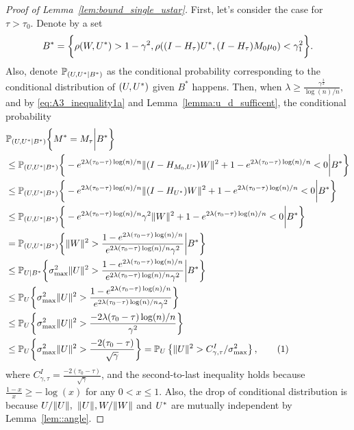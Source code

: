 \documentclass[10pt,a4paper]{amsart}
\def\P{\mathbb P}
\newcommand\numberthis{\addtocounter{equation}{1}\tag{\theequation}}
\begin{document}
\begin{proof}[Proof of Lemma~\ref{lem:bound_single_ustar}]
First, let's consider the case for $\tau > \tau_0.$
Denote by a set 
\begin{align*}
 B^*  =  \bigg\{\rho(\*W, \*U^*) > 1-\gamma^2, \rho((\*I - \*H_\tau)\*U^*, (\*I - \*H_\tau)\*M_0\*\mu_0)<  \gamma_1^2\bigg\}. 
\end{align*}
Also, denote $\P_{(\*U, \*U^*|B^*)}$ as the conditional probability corresponding to the conditional distribution of $(\*U, \*U^*)$ given $B^*$ happens.
  Then, when $\lambda \geq \frac{\gamma^{\frac32}}{\log(n)/n},$ and by \eqref{eq:A3_inequality1a} and Lemma~\ref{lemma:u_d_sufficent}, the conditional probability
\begin{align*}
     & \P_{(\*U, \*U^*|B^*)}\bigg\{{\*M}^* = \*M_\tau \bigg | B^*\bigg\} \\
    & \leq \P_{(\*U, \*U^*|B^*)}\bigg\{ - e^{2\lambda(\tau_0-\tau)\log(n)/n} \|(\*I-\*H_{\*M_0, \*U^*})\*W\|^2+1 -e^{2\lambda(\tau_0-\tau)\log(n)/n} < 0 \bigg| B^*\bigg\}\\
    & \leq \P_{(\*U, \*U^*|B^*)}\bigg\{ - e^{2\lambda(\tau_0-\tau)\log(n)/n} \|(\*I-\*H_{\*U^*})\*W\|^2+1 -e^{2\lambda(\tau_0-\tau)\log(n)/n} < 0 \bigg |  B^*\bigg\} \\
    & \leq \P_{(\*U, \*U^*|B^*)}\bigg\{ - e^{2\lambda(\tau_0-\tau)\log(n)/n}\gamma^2\|\*W\|^2 +1 -e^{2\lambda(\tau_0-\tau)\log(n)/n} < 0 \bigg | B^*
    \bigg\}\\
    & = 
    \P_{(\*U, \*U^*|B^*)}\bigg\{ \|\*W\|^2 > \frac{1 -e^{2\lambda(\tau_0-\tau)\log(n)/n}}{ e^{2\lambda(\tau_0-\tau)\log(n)/n}\gamma^2} \bigg |B^*\bigg\}\\
    & \leq \P_{\*U|B^*}\bigg\{ \sigma^2_{\max}\|\*U\|^2 > \frac{1 -e^{2\lambda(\tau_0-\tau)\log(n)/n}}{ e^{2\lambda(\tau_0-\tau)\log(n)/n}\gamma^2} \bigg | B^*\bigg\}
  \\
    & \leq \P_{\*U}\bigg\{ \sigma^2_{\max}\|\*U\|^2 > \frac{1 -e^{2\lambda(\tau_0-\tau)\log(n)/n}}{ e^{2\lambda(\tau_0-\tau)\log(n)/n}\gamma^2} \bigg\}\\
    & \leq \P_{\*U}\bigg\{ \sigma^2_{\max}\|\*U\|^2 > \frac{ -2\lambda(\tau_0-\tau)\log(n)/n}{ \gamma^2} \bigg\}\\
    & \leq \P_{\*U}\bigg\{ \sigma^2_{\max}\|\*U\|^2 > \frac{ -2(\tau_0-\tau)}{ \sqrt{\gamma}} \bigg\} =  \P_{\*U}\left\{\|\*U\|^2  >  C^I_{\gamma, \tau}/\sigma^2_{\max}\right\}, \numberthis \label{eq:CI_gamma}
 \end{align*}
 where $C^I_{\gamma, \tau} = \frac{ -2(\tau_0-\tau)}{ \sqrt{\gamma}}$, and  
 the second-to-last inequality holds because $\frac{1-x}{x}\geq  -\log(x)$ for any $0 < x \leq 1.$ Also, the 
 drop of conditional distribution is because $\*U/\|\*U\|,$ $\|\*U\|, \*W/\|\*W\|$ and $\*U^*$ are mutually independent by Lemma~\ref{lem::angle}. 
 


\end{proof}
\end{document}
